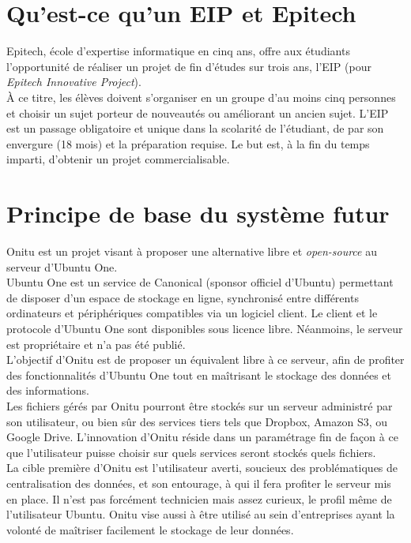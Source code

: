 \section{Qu'est-ce qu'un EIP et Epitech}
Epitech, école d'expertise informatique en cinq ans, offre aux étudiants l'opportunité de réaliser un projet de fin d'études sur trois ans, l'EIP (pour \emph{Epitech Innovative Project}).\\

À ce titre, les élèves doivent s'organiser en un groupe d'au moins cinq personnes et choisir un sujet porteur de nouveautés ou améliorant un ancien sujet. L'EIP est un passage obligatoire et unique dans la scolarité de l'étudiant, de par son envergure (18 mois) et la préparation requise. Le but est, à la fin du temps imparti, d'obtenir un projet commercialisable.


\section{Principe de base du système futur}
    Onitu est un projet visant à proposer une alternative libre et \emph{open-source} au serveur d’Ubuntu One.\\

    Ubuntu One est un service de Canonical (sponsor officiel d'Ubuntu) permettant de disposer d’un espace de stockage en ligne, synchronisé entre différents ordinateurs et périphériques compatibles via un logiciel client. Le client et le protocole d’Ubuntu One sont disponibles sous licence libre. Néanmoins, le serveur est propriétaire et n’a pas été publié.\\

    L'objectif d'Onitu est de proposer un équivalent libre à ce serveur, afin de profiter des fonctionnalités d’Ubuntu One tout en maîtrisant le stockage des données et des informations.\\

    Les fichiers gérés par Onitu pourront être stockés sur un serveur administré par son utilisateur, ou bien sûr des services tiers tels que Dropbox, Amazon S3, ou Google Drive. L'innovation d'Onitu réside dans un paramétrage fin de façon à ce que l'utilisateur puisse choisir sur quels services seront stockés quels fichiers.\\

    La cible première d'Onitu est l'utilisateur averti, soucieux des problématiques de centralisation des données, et son entourage, à qui il fera profiter le serveur mis en place. Il n'est pas forcément technicien mais assez curieux, le profil même de l'utilisateur Ubuntu.
    Onitu vise aussi à être utilisé au sein d'entreprises ayant la volonté de maîtriser facilement le stockage de leur données.\\
